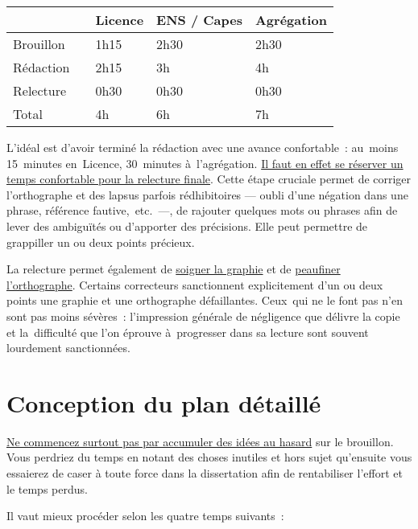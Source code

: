 \documentclass[a4paper,12pt]{report}
\begin{document}
\begin{center}
\begin{tabular}{|l|l|l|l|l|}
\hline
 &  & Licence & ENS / Capes & Agrégation\\[0pt]
\hline
\hline
Brouillon &  & 1h15 & 2h30 & 2h30\\[0pt]
Rédaction &  & 2h15 & 3h & 4h\\[0pt]
Relecture &  & 0h30 & 0h30 & 0h30\\[0pt]
\hline
\hline
Total &  & 4h & 6h & 7h\\[0pt]
\hline
\end{tabular}
\end{center}

L'idéal est d'avoir terminé la rédaction avec une avance confortable :
au moins 15 minutes en Licence, 30 minutes à l'agrégation. \uline{Il faut en
effet se réserver un temps confortable pour la relecture finale}. Cette
étape cruciale permet de corriger l'orthographe et des lapsus parfois
rédhibitoires — oubli d'une négation dans une phrase, référence
fautive, etc. —, de rajouter quelques mots ou phrases afin de lever des
ambiguïtés ou d'apporter des précisions. Elle peut permettre de
grappiller un ou deux points précieux.

La relecture permet également de \uline{soigner la graphie} et de \uline{peaufiner
l'orthographe}. Certains correcteurs sanctionnent explicitement d'un ou
deux points une graphie et une orthographe défaillantes. Ceux qui ne le
font pas n'en sont pas moins sévères : l'impression générale de
négligence que délivre la copie et la difficulté que l'on éprouve
à progresser dans sa lecture sont souvent lourdement sanctionnées.


\chapter{Conception du plan détaillé}
\label{sec:org54e9a92}

\uline{Ne commencez surtout pas par accumuler des idées au hasard} sur le
brouillon. Vous perdriez du temps en notant des choses inutiles et hors
sujet qu'ensuite vous essaierez de caser à toute force dans la
dissertation afin de rentabiliser l'effort et le temps perdus.

Il vaut mieux procéder selon les quatre temps suivants :
\end{document}
